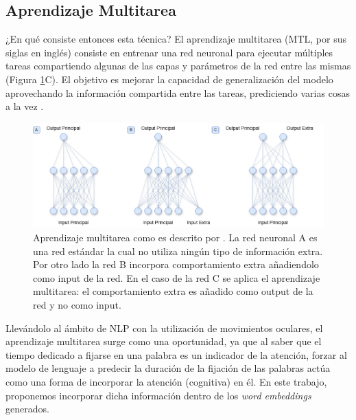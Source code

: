 \subsection{Aprendizaje Multitarea}

¿En qué consiste entonces esta técnica? El aprendizaje multitarea (MTL, por sus siglas en inglés) consiste en entrenar una red neuronal para ejecutar múltiples tareas compartiendo algunas de las capas y parámetros de la red entre las mismas (Figura \ref{fig:multitarea}C). El objetivo es mejorar la capacidad de generalización del modelo aprovechando la información compartida entre las tareas, prediciendo varias cosas a la vez \parencite{Caruana1997}.

\begin{figure}[H]
    \centering
    \includegraphics[width=1\textwidth]{imagenes/multitarea.png}
    \caption{Aprendizaje multitarea como es descrito por \textcite{Caruana1997}. La red neuronal A es una red estándar la cual no utiliza ningún tipo de información extra. Por otro lado la red B incorpora comportamiento extra añadiendolo como input de la red. En el caso de la red C se aplica el aprendizaje multitarea: el comportamiento extra es añadido como output de la red y no como input.}
    \label{fig:multitarea}
\end{figure}

Llevándolo al ámbito de NLP con la utilización de movimientos oculares, el aprendizaje multitarea surge como una oportunidad, ya que al saber que el tiempo dedicado a fijarse en una palabra es un indicador de la atención, forzar al modelo de lenguaje a predecir la duración de la fijación de las palabras actúa como una forma de incorporar la atención (cognitiva) en él. En este trabajo, proponemos incorporar dicha información dentro de los \textit{word embeddings} generados.
